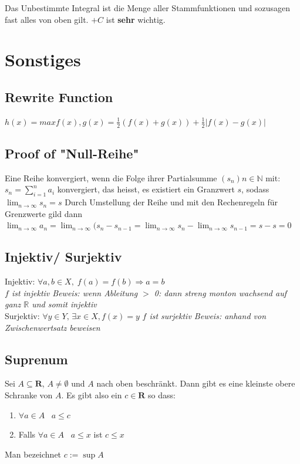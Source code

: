 \documentclass[8pt]{article}
\def\R{\mathbb{R}}
\begin{document}
\begin{multicols*}{3}
Das Unbestimmte Integral ist die Menge aller Stammfunktionen und sozusagen fast alles von oben gilt. $+C$ ist \textbf{sehr} wichtig.
\section{Sonstiges}
\subsection{Rewrite Function}
$h(x) = max{f(x), g(x)} = \frac{1}{2}(f(x) + g(x)) + \frac{1}{2}|f(x) -g(x)|$

\subsection{Proof of "Null-Reihe"}
Eine Reihe konvergiert, wenn die Folge ihrer Partialsumme $(s_n) n \in \mathbb{N} $ mit: $s_n = \sum_{i=1}^{n} a_i$ konvergiert, das heisst, es existiert ein Granzwert $s$, sodass
	$\lim_{n \to \infty} s_n = s$  Durch Umstellung der Reihe und mit den Rechenregeln für Grenzwerte gild dann
	$\lim_{n \to \infty} a_n = \lim_{n \to \infty} (s_n - s_{n - 1} = \lim_{n \to \infty} s_n - \lim_{n \to \infty} s_{n-1} =  s - s = 0$

\hypertarget{sec:5}{}

\subsection{Injektiv/ Surjektiv}

Injektiv: $\forall a, b \in X, \;f(a) = f(b) \Rightarrow a = b$\\
\textit{$f$ ist injektiv Beweis: wenn Ableitung $>$ 0: dann streng monton wachsend auf ganz $\R$ und somit injektiv}\\
Surjektiv: $\forall y \in Y, \, \exists x \in X, f(x) = y$
\textit{$f$ ist surjektiv Beweis: anhand von Zwischenwertsatz beweisen}\\

\subsection{Suprenum}

Sei $A \subseteq \mathbf{R}$, $ A \neq \emptyset$ und $A$ nach oben beschränkt. Dann gibt es
eine kleinste obere Schranke von $A$. Es gibt also ein $c \in \mathbf{R}$ so dass:
\begin{enumerate}
  \item $\forall a \in A \; \; \; a \leq c$
  \item Falls $\forall a \in A \; \; \; a \leq x$ ist $c \leq x$
\end{enumerate}
Man bezeichnet $c := \sup A$ 


\end{multicols*}
\end{document}
